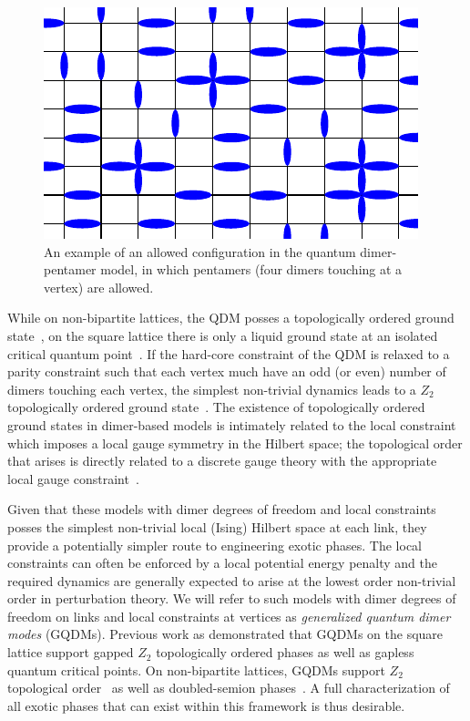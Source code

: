 \documentclass[twocolumn,prb,aps,floatfix,superscriptaddress]{revtex4-1}
\begin{document}
\begin{figure}[t!]
    \centering
    \includegraphics[width=0.75\columnwidth]{QDPM_ex_config.pdf}
    \caption{An example of an allowed configuration in the quantum dimer-pentamer model, in which pentamers (four dimers touching at a vertex) are allowed.}
    \label{fig:QDPMex}
\end{figure}

While on non-bipartite lattices, the QDM posses a topologically ordered ground state~\cite{Moessner2001a,Fendley2002}, on the square lattice there is only a liquid ground state at an isolated critical quantum point~\cite{Leung1996,Syljuasen2006}. If the hard-core constraint of the QDM is relaxed to a parity constraint such that each vertex much have an odd (or even) number of dimers touching each vertex, the simplest non-trivial dynamics leads to a $Z_2$ topologically ordered ground state~\cite{Kitaev2003,Wen2003}. The existence of topologically ordered ground states in dimer-based models is intimately related to the local constraint which imposes a local gauge symmetry in the Hilbert space; the topological order that arises is directly related to a discrete gauge theory with the appropriate local gauge constraint~\cite{Moessner2001}.

Given that these models with dimer degrees of freedom and local constraints posses the simplest non-trivial local (Ising) Hilbert space at each link, they provide a potentially simpler route to engineering exotic phases. The local constraints can often be enforced by a local potential energy penalty and the required dynamics are generally expected to arise at the lowest order non-trivial order in perturbation theory. We will refer to such models with dimer degrees of freedom on links and local constraints at vertices as \emph{generalized quantum dimer modes} (GQDMs). Previous work as demonstrated that GQDMs on the square lattice support gapped $Z_2$ topologically ordered phases as well as gapless quantum critical points. On non-bipartite lattices, GQDMs support $Z_2$ topological order~\cite{Moessner2001a,Misguich2002} as well as doubled-semion phases~\cite{Qi2014,Buerschaper2014a}. A full characterization of all exotic phases that can exist within this framework is thus desirable.
\end{document}
